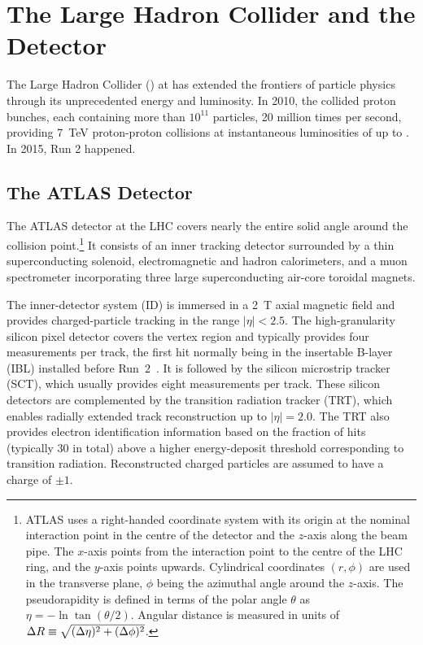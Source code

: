 \chapter{The Large Hadron Collider and the \ATLAS Detector}\label{chap:lhc_atlas}

The Large Hadron Collider (\LHC) at \CERN has extended the frontiers of particle physics through its unprecedented energy and luminosity.
In 2010, the \LHC collided proton bunches, each containing more than $10^{11}$ particles, 20 million times per second, providing \SI{7}{\TeV} proton-proton collisions at instantaneous luminosities of up to \peakLumi.
In 2015, Run 2 happened.

\section{The ATLAS Detector}\label{sec:atlas_detector}

\newcommand{\AtlasCoordFootnote}{%
ATLAS uses a right-handed coordinate system with its origin at the nominal interaction point in the centre of the detector and the \(z\)-axis along the beam pipe. The \(x\)-axis points from the interaction point to the centre of the LHC ring, and the \(y\)-axis points upwards. Cylindrical coordinates \((r,\phi)\) are used in the transverse plane, \(\phi\) being the azimuthal angle around the \(z\)-axis. The pseudorapidity is defined in terms of the polar angle \(\theta\) as \(\eta = -\ln \tan(\theta/2)\). Angular distance is measured in units of \(\DeltaR \equiv \sqrt{(\Delta\eta)^{2} + (\Delta\phi)^{2}}\).}

The ATLAS detector at the LHC covers nearly the entire solid angle around the collision point.\footnote{\AtlasCoordFootnote}
It consists of an inner tracking detector surrounded by a thin superconducting solenoid, electromagnetic and hadron calorimeters,
and a muon spectrometer incorporating three large superconducting air-core toroidal magnets.

The inner-detector system (ID) is immersed in a \SI{2}{\tesla} axial magnetic field 
and provides charged-particle tracking in the range \(|\eta| < 2.5\).
The high-granularity silicon pixel detector covers the vertex region and typically provides four measurements per track, 
the first hit normally being in the insertable B-layer (IBL) installed before Run~2~\cite{ATLAS-TDR-19,PIX-2018-001}.
It is followed by the silicon microstrip tracker (SCT), which usually provides eight measurements per track.
These silicon detectors are complemented by the transition radiation tracker (TRT),
which enables radially extended track reconstruction up to \(|\eta| = 2.0\). 
The TRT also provides electron identification information 
based on the fraction of hits (typically 30 in total) above a higher energy-deposit threshold corresponding to transition radiation.
Reconstructed charged particles are assumed to have a charge of $\pm 1$.


